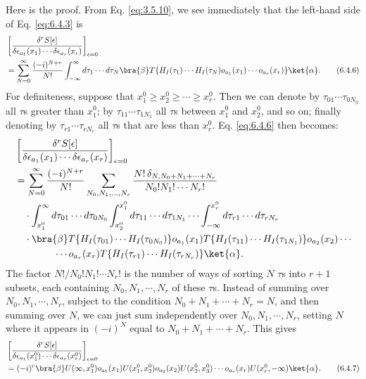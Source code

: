 Here is the proof. From Eq. \eqref{eq:3.5.10}, we see immediately that the left-hand
side of Eq. \eqref{eq:6.4.3} is
\begin{align}
&\left[
\frac{\delta^rS[\epsilon]}
{\delta\epsilon_{a_1}(x_1)\cdots\delta\epsilon_{a_r}(x_r)}
\right]_{\epsilon=0}\notag\\
&=\sum_{N=0}^{\infty}\frac{(-i)^{N+r}}{N!}
\int_{-\infty}^{\infty}d\tau_1\cdots d\tau_N
\bra{\beta}T\{H_I(\tau_1)\cdots H_I(\tau_N)
o_{a_1}(x_1)\cdots o_{a_r}(x_r)\}\ket{\alpha}.
\tag{6.4.6}
\label{eq:6.4.6}
\end{align}
For definiteness, suppose that $x_1^0\geq x_2^0\geq\cdots\geq x_r^0$. Then
we can denote by $\tau_{01}\cdots\tau_{0N_0}$ all $\tau$s greater than $x_1^0$;
by $\tau_{11}\cdots\tau_{1N_1}$ all $\tau$s between $x_1^0$ and $x_2^0$, and
so on; finally denoting by $\tau_{r1}\cdots\tau_{rN_r}$ all $\tau$s that are
less than $x_r^0$. Eq. \eqref{eq:6.4.6} then becomes:
\begin{align*}
&\left[
\frac{\delta^rS[\epsilon]}
{\delta\epsilon_{a_1}(x_1)\cdots\delta\epsilon_{a_r}(x_r)}
\right]_{\epsilon=0}\\
&=\sum_{N=0}^{\infty}\frac{(-i)^{N+r}}{N!}
\sum_{N_0,N_1,\ldots,N_r}
\frac{N!\,\delta_{N,N_0+N_1+\cdots+N_r}}{N_0!N_1!\cdots N_r!}\\
&\quad\cdot
\int_{x_1^0}^{\infty}d\tau_{01}\cdots d\tau_{0N_0}
\int_{x_2^0}^{x_1^0}d\tau_{11}\cdots d\tau_{1N_1}\cdots
\int_{-\infty}^{x_r^0}d\tau_{r1}\cdots d\tau_{rN_r}\\
&\quad\cdot\bra{\beta}
T\{H_I(\tau_{01})\cdots H_I(\tau_{0N_0})\}o_{a_1}(x_1)
T\{H_I(\tau_{11})\cdots H_I(\tau_{1N_1})\}o_{a_2}(x_2)\cdots\\
&\qquad\qquad{}\cdots o_{a_r}(x_r)
T\{H_I(\tau_{r1})\cdots H_I(\tau_{rN_r})\}\ket{\alpha}.
\end{align*}
The factor $N!/N_0!N_1!\cdots N_r!$ is the number of ways of sorting $N$
$\tau$s into $r+1$ subsets, each containing $N_0,N_1,\cdots,N_r$ of these
$\tau$s. Instead of summing over $N_0,N_1,\cdots,N_r$, subject to the
condition $N_0+N_1+\cdots+N_r=N$, and then summing over $N$, we can just sum
independently over $N_0,N_1,\cdots,N_r$, setting $N$ where it appears in
$(-i)^N$ equal to $N_0+N_1+\cdots+N_r$. This gives
\begin{align}
&\left[
\frac{\delta^rS[\epsilon]}
{\delta\epsilon_{a_1}(x_1^0)\cdots\delta\epsilon_{a_r}(x_r^0)}
\right]_{\epsilon=0}\notag\\
&=(-i)^r\bra{\beta}U(\infty,x_1^0)o_{a_1}(x_1)
U(x_1^0,x_2^0)o_{a_2}(x_2)U(x_2^0,x_3^0)\cdots
o_{a_r}(x_r)U(x_r^0,-\infty)\ket{\alpha}.
\tag{6.4.7}
\label{eq:6.4.7}
\end{align}
